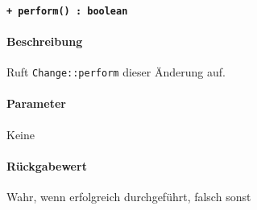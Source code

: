 \paragraph{\texttt{+ perform() : boolean}}\label{AP_ChangeAction_perform}%
\paragraph*{Beschreibung}
Ruft \verb#Change::perform# dieser Änderung auf.
\paragraph*{Parameter}
Keine
\paragraph*{Rückgabewert}
Wahr, wenn erfolgreich durchgeführt, falsch sonst